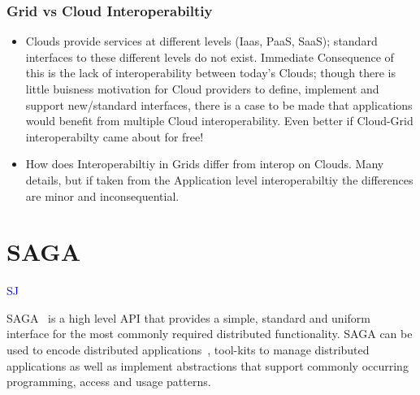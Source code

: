 \documentclass[conference,final]{IEEEtran}
\begin{document}
\subsubsection*{Grid vs Cloud Interoperabiltiy}

\begin{itemize}
\item Clouds provide services at different levels (Iaas, PaaS, SaaS);
  standard interfaces to these different levels do not
  exist. Immediate Consequence of this is the lack of interoperability
  between today's Clouds; though there is little buisness motivation
  for Cloud providers to define, implement and support new/standard
  interfaces, there is a case to be made that applications would
  benefit from multiple Cloud interoperability.  Even better if
  Cloud-Grid interoperabilty came about for free!
\item How does Interoperabiltiy in Grids differ from interop on
  Clouds.  Many details, but if taken from the Application level
  interoperabiltiy the differences are minor and inconsequential.
\end{itemize}

\section{SAGA}  {\textcolor{blue} {SJ}}


SAGA~\cite{saga-core} is a high level API that provides a simple,
standard and uniform interface for the most commonly required
distributed functionality.  SAGA can be used to encode distributed
applications~\cite{saga_escience07_short, saga_tg08}, tool-kits to
manage distributed applications as well as implement abstractions that
support commonly occurring programming, access and usage patterns.
\end{document}
